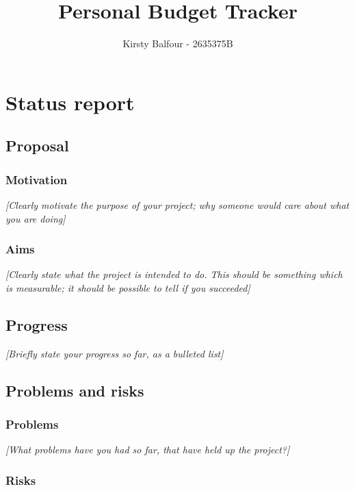 \documentclass[11pt]{article}
\title{ Personal Budget Tracker }
\author{ Kirsty Balfour - 2635375B }
\begin{document}
    \maketitle
    
    
     

\section{Status report}

\subsection{Proposal}\label{proposal}

\subsubsection{Motivation}\label{motivation}

\emph{{[}Clearly motivate the purpose of your project; why someone would
care about what you are doing{]}}

\subsubsection{Aims}\label{aims}

\emph{{[}Clearly state what the project is intended to do. This should
be something which is measurable; it should be possible to tell if you
succeeded{]}}

\subsection{Progress}\label{progress}

\emph{{[}Briefly state your progress so far, as a bulleted list{]}}

\subsection{Problems and risks}\label{problems-and-risks}

\subsubsection{Problems}\label{problems}

\emph{{[}What problems have you had so far, that have held up the
project?{]}}

\subsubsection{Risks}\label{risks}
\end{document}
